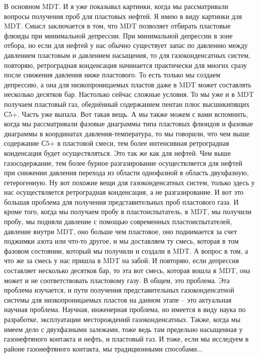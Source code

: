\documentclass[main.tex]{subfiles}
\begin{document}
В основном MDT.
И я уже показывал картинки, когда мы рассматривали вопросы получения проб для пластовых нефтей.
Я имею в виду картинки для MDT.
Смысл заключается в том, что MDT позволяет отбирать пластовые флюиды при минимальной депрессии.
При минимальной депрессии в зоне отбора, но если для нефтей у нас обычно существует запас по давлению между давлением пластовым и давлением насыщения, то для газоконденсатных систем, повторяю, ретроградная конденсация начинается практически для многих сразу после снижения давления ниже пластового.
То есть только мы создаем депрессию, а она для низкопроницаемых пластов даже в MDT может составлять несколько десятков бар.
Настолько сейчас сложные условия.
То мы уже и в MDT получаем пластовый газ, обеднённый содержанием пентан плюс высшикипящих С5+.
Часть уже выпала.
Вот такая вещь.
А мы также можем с вами вспомнить, когда мы рассматривали фазовые диаграммы типа пластовых флюидов и фазовые диаграммы в координатах давления-температура, то мы говорили, что чем выше содержание С5+ в пластовой смеси, тем более интенсивная ретроградная конденсация будет осуществляться.
Это так же как для нефтей.
Чем выше газосодержание, тем более бурное разгазирование осуществляется для нефтей при снижении давления перехода из области однофазной в область двухфазную, гетерогенную.
Ну вот похожие вещи для газоконденсатных систем, только здесь у нас осуществляется ретроградная конденсация, а не разгазирование.
И вот это большая проблема для получения представительных проб пластового газа.
И кроме того, когда мы получаем пробу в пластоиспытатель, в MDT, мы получили пробу, мы подняли давление с помощью современных пластоиспытателей, давление внутри MDT, оно больше чем пластовое, оно поднимается за счет поджимки азота или что-то другое, и мы доставляем ту смесь, которая в том фазовом состоянии, который мы получили и создали в MDT.
А вопрос в том, а что же за смесь у нас пришла в MDT на забой.
И повторяю, если депрессия составляет несколько десятков бар, то эта вот смесь, которая вошла в MDT, она может и не соответствовать пластовому газу.
В общем, это проблема.
Эта проблема изучается, и пути получения представительных газоконденсатной системы для низкопроницаемых пластов на данном этапе -- это актуальная научная проблема.
Научная, инженерная проблема, но имеется в виду наука по разработке, эксплуатации месторождений газоконденсатных.
Также, когда мы имеем дело с двухфазными залежами, тоже ведь там предельно насыщенная у газонефтяного контакта и нефть, и пластовый газ.
И тоже, если мы исследуем в районе газонефтяного контакта, мы традиционными способами...
\end{document}
